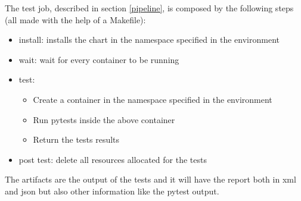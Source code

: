 \documentclass[a4paper]{spie}  %
\begin{document}
The test job, described in section \ref{pipeline}, is composed by the following steps (all made with the help of a Makefile):
\begin{itemize}
    \item install: installs the chart in the namespace specified in the environment
    \item wait: wait for every container to be running
    \item test:
    \begin{itemize}
        \item Create a container in the namespace specified in the environment
        \item Run pytests inside the above container
        \item Return the tests results
    \end{itemize}
    \item post test: delete all resources allocated for the tests
\end{itemize}

The artifacts are the output of the tests and it will have the report both in xml and json but also other information like the pytest output.
\end{document}
